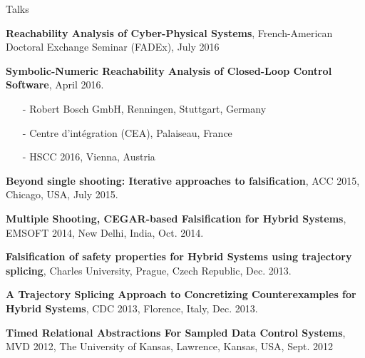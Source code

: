 \begin{rSection}{Talks}

\textbf{Reachability Analysis of Cyber-Physical Systems},
French-American Doctoral Exchange Seminar (FADEx),
July 2016

\textbf{Symbolic-Numeric Reachability Analysis of Closed-Loop Control Software}, April 2016.
	\begin{itemize}
    \itemsep-6pt
      \item[-] Robert Bosch GmbH, Renningen, Stuttgart, Germany
      \item[-] Centre d'intégration (CEA), Palaiseau, France
      \item[-] HSCC 2016, Vienna, Austria
    \end{itemize}

\textbf{Beyond single shooting: Iterative approaches to falsification},
ACC 2015, Chicago, USA,
July 2015.

\textbf{Multiple Shooting, CEGAR-based Falsification for Hybrid Systems},
EMSOFT 2014, New Delhi, India,
Oct. 2014.

\textbf{Falsification of safety properties for Hybrid Systems using trajectory splicing},
Charles University, Prague, Czech Republic,
Dec. 2013.

\textbf{A Trajectory Splicing Approach to Concretizing Counterexamples for Hybrid Systems},
CDC 2013, Florence, Italy,
Dec. 2013.

\textbf{Timed Relational Abstractions For Sampled Data Control Systems},
MVD 2012, The University of Kansas, Lawrence, Kansas, USA,
Sept. 2012
\end{rSection}


